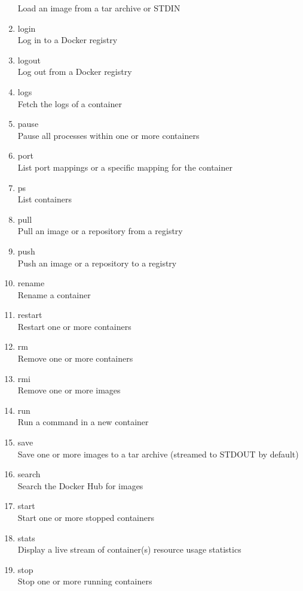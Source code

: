 \begin{enumerate}
    Load an image from a tar archive or STDIN
\item login       \\
    Log in to a Docker registry
\item logout      \\
    Log out from a Docker registry
\item logs        \\
    Fetch the logs of a container
\item pause       \\
    Pause all processes within one or more containers
\item port        \\
    List port mappings or a specific mapping for the container
\item ps          \\
    List containers
\item pull        \\
    Pull an image or a repository from a registry
\item push        \\
    Push an image or a repository to a registry
\item rename      \\
    Rename a container
\item restart     \\
    Restart one or more containers
\item rm          \\
    Remove one or more containers
\item rmi         \\
    Remove one or more images
\item run         \\
    Run a command in a new container
\item save        \\
    Save one or more images to a tar archive (streamed to STDOUT by default)
\item search      \\
    Search the Docker Hub for images
\item start       \\
    Start one or more stopped containers
\item stats       \\
    Display a live stream of container(s) resource usage statistics
\item stop        \\
    Stop one or more running containers

\end{enumerate}
